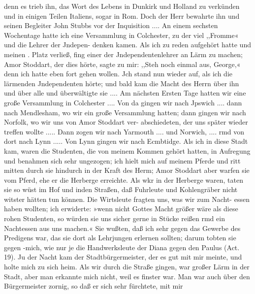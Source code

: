 denn es trieb ihn, das Wort des Lebens in Dunkirk und Holland
zu verkünden und in einigen Teilen Italiens, sogar in Rom.
Doch der Herr bewahrte ihn und seinen Begleiter John Stubbs
vor der Inquisition ....
An einem sechsten Wochentage hatte ich eine Versammlung
in Colchester, zu der viel ,,Fromme« und die Lehrer der Jndepen-
denken kamen. Als ich zu reden aufgehört hatte und meinen
. Platz verließ, fing einer der Jndependentenlehrer an Lärm zu
machen; Amor Stoddart, der dies hörte, sagte zu mir: ,,Steh
noch einmal aus, George,« denn ich hatte eben fort gehen wollen.
Jch stand nun wieder auf, als ich die lärmenden Jndependenten
hörte; und bald kam die Macht des Herrn über ihn und über
alle und überwältigte sie ....
Am nächsten Ersten Tage hatten wir eine große Versammlung
in Colchester .... Von da gingen wir nach Jpswich .... dann
nach Mendlesham, wo wir ein große Versammlung hatten; dann
gingen wir nach Norfolk, wo wir uns von Amor Stoddart ver-
abschiedeten, der uns später wieder treffen wollte ..... Dann
zogen wir nach Yarmouth .... und Norwich, .... rmd von
dort nach Lynn ..... Von Lynn gingen wir nach Ecmbtidge.
Als ich in diese Stadt kam, waren die Studenten, die von
meinem Kommen gehört hatten, in Aufregung und benahmen
sich sehr ungezogen; ich hielt mich auf meinem Pferde und ritt
mitten durch sie hindurch in der Kraft des Herm; Amor Stoddart
aber warfen sie vom Pferd, ehe er die Herberge erreichte. Als
wkr in der Herberge waren, taten sie so wüst im Hof und inden
Straßen, daß Fuhrleute und Kohlengräber nicht witster hätten
tun können. Die Wirtsleute fragten uns, was wir zum Nacht-
essen haben wollten; ich erwiderte: »wenn nicht Gottes Macht
größer wäre als diese rohen Studenten, so würden sie uns sicher
gerne in Stücke reißen rmd ein Nachtessen aus uns machen.« Sie
wußten, daß ich sehr gegen das Gewerbe des Predigens war, das
sie dort als Lehrjungen erlernen sollten; darum tobten sie gegen
-mich, wie nur je die Handwerksleute der Diana gegen den Paulus
(Act. 19). Ju der Nacht kam der Stadtbürgermeister, der es gut
mit mir meinte, und holte mich zu sich heim. Als wir durch
die Straße gingen, war großer Lärm in der Stadt, aber man
erkannte mich nicht, weil es finster war. Man war auch über
den Bürgermeister zornig, so daß er sich sehr fürchtete, mit mir


